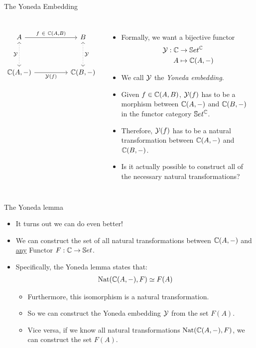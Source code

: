 \begin{frame}[fragile]{The Yoneda Embedding}
	\begin{columns}
		\[\begin{tikzcd}
			A && B \\
			\\
			{\bC(A, -)} && {\bC(B,-)}
			\arrow["{f\ \in\ \mathbb{C}(A,B)}", from=1-1, to=1-3]
			\arrow["{\mathcal{Y}}"', dotted, leftrightarrow, from=1-1, to=3-1]
			\arrow["{\mathcal{Y}}", dotted, leftrightarrow, from=1-3, to=3-3]
			\arrow["{\mathcal{Y}(f)}"', from=3-1, to=3-3]
		\end{tikzcd}\]
		\begin{itemize}
			\item Formally, we want a bijective functor
			\begin{align*}
				\mathcal{Y} : \mathbb{C} &\to \mathbb{S} et^{\mathbb{C}}\\
				A &\mapsto \mathbb{C}(A,-)
			\end{align*}
			\vspace{-16pt}\pause\item We call $\mathcal{Y}$ the \textit{Yoneda embedding}.
			\pause\item Given $f \in \mathbb{C}(A,B)$, $\mathcal{Y}(f)$ has to be a morphism between $\mathbb{C}(A, -)$ and $\mathbb{C}(B, -)$ in the functor category $\mathbb{S} et^{\mathbb{C}}$.
			\pause\item Therefore, $\mathcal{Y}(f)$ has to be a natural transformation between $\mathbb{C}(A, -)$ and $\mathbb{C}(B, -)$. 
			\pause\item Is it actually possible to construct all of the necessary natural transformations?
		\end{itemize}
	\end{columns}
\end{frame}
\begin{frame}{The Yoneda lemma}
	\begin{itemize}
		\item It turns out we can do even better!
		\pause\item We can construct the set of all natural transformations between $\mathbb{C}(A, -)$ and \underline{any} Functor $F :\mathbb{C} \to \mathbb{S} et$.
		\pause\item Specifically, the Yoneda lemma states that:
		\begin{align*}
			\text{Nat}(\mathbb{C}(A,-), F) \simeq F(A)
		\end{align*}
		\begin{itemize}
			\vspace{-18pt}\pause\item Furthermore, this isomorphism is a natural transformation.
			\pause\item So we can construct the Yoneda embedding $\mathcal{Y}$ from the set $F(A)$.
			\pause\item Vice versa, if we know all natural transformations $\text{Nat}(\mathbb{C}(A,-), F)$, we can construct the set $F(A)$.
		\end{itemize}
	\end{itemize}
\end{frame}

